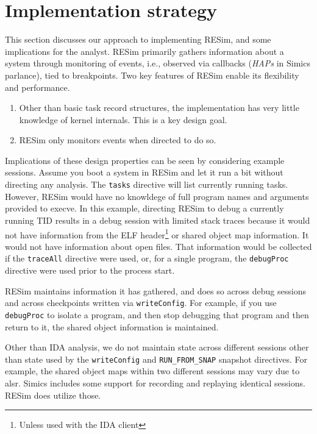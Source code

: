\documentclass[titlepage]{article}
\begin{document}
\section{Implementation strategy}
\label{implementation}
This section discusses our approach to implementing RESim, and some implications for the analyst.
RESim primarily gathers information about a system through monitoring of events, i.e., observed via callbacks (\textit{HAPs} in Simics parlance), tied to 
breakpoints.  Two key features of RESim enable its flexibility and performance.  

\begin{enumerate}
\item Other than basic task record structures, the implementation has very little knowledge of kernel internals.
This is a key design goal.  
\item RESim only monitors events when directed to do so.
\end{enumerate}
\noindent Implications of these design properties can be seen by considering example sessions.  Assume you boot a system in RESim and let it run a bit without
directing any analysis.  The {\tt tasks} directive will list currently running tasks.  However, RESim would have no knowldege of full program names and arguments
provided to execve.  In this example, directing RESim to debug a currently running TID results in a debug session with limited stack traces because
it would not have information from the ELF header\footnote{Unless used with the IDA client}  or shared object map information.  It would not have
information about open files.
That information would be collected if the {\tt traceAll} directive were used, or, for a single program, the {\tt debugProc} directive were used prior to the
process start.

RESim maintains information it has gathered, and does so across debug sessions and across checkpoints written via {\tt writeConfig}.  For example, if you
use {\tt debugProc} to isolate a program, and then stop debugging that program and then return to it, the shared object information is maintained.

Other than IDA analysis, we do not maintain state across different sessions other than state used by the {\tt writeConfig} and {\tt RUN\_FROM\_SNAP} snapshot directives.
For example, the shared object maps within two different sessions may vary due to alsr.  Simics includes some support for recording and replaying identical sessions.  
RESim does utilize those.
\end{document}
